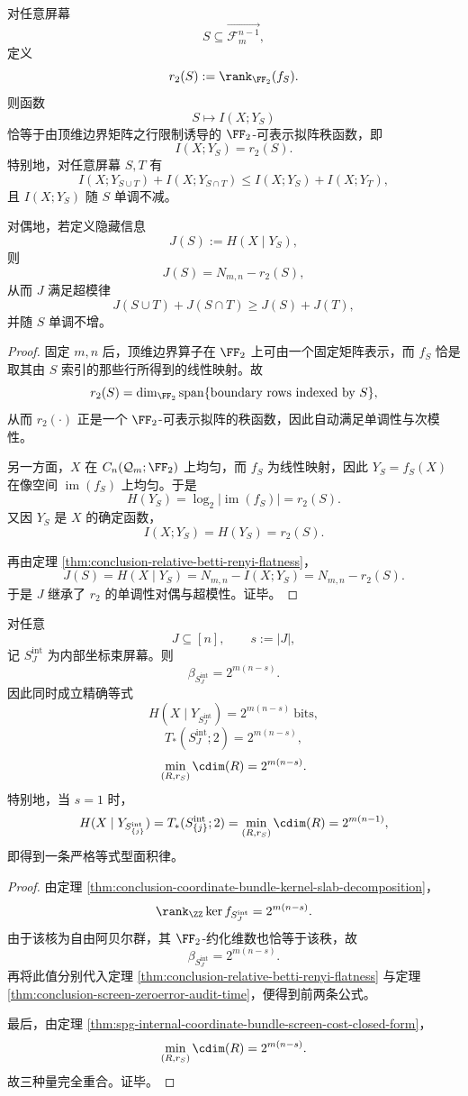 \begin{theorem}[屏幕信息的拟阵秩结构与隐藏信息的超模律]\label{thm:conclusion-screen-information-matroid-supermodularity}
对任意屏幕
\[
S\subseteq \overrightarrow{\mathcal F_m^{n-1}},
\]
定义
\[
r_2(S):=\rank_{\FF_2}(f_S).
\]
则函数
\[
S\longmapsto I(X;Y_S)
\]
恰等于由顶维边界矩阵之行限制诱导的 \(\FF_2\)-可表示拟阵秩函数，即
\[
I(X;Y_S)=r_2(S).
\]
特别地，对任意屏幕 \(S,T\) 有
\[
I(X;Y_{S\cup T})+I(X;Y_{S\cap T})
\le
I(X;Y_S)+I(X;Y_T),
\]
且 \(I(X;Y_S)\) 随 \(S\) 单调不减。

对偶地，若定义隐藏信息
\[
J(S):=H(X\mid Y_S),
\]
则
\[
J(S)=N_{m,n}-r_2(S),
\]
从而 \(J\) 满足超模律
\[
J(S\cup T)+J(S\cap T)\ge J(S)+J(T),
\]
并随 \(S\) 单调不增。
\end{theorem}

\begin{proof}
固定 \(m,n\) 后，顶维边界算子在 \(\FF_2\) 上可由一个固定矩阵表示，而 \(f_S\) 恰是取其由 \(S\) 索引的那些行所得到的线性映射。故
\[
r_2(S)
=
\dim_{\FF_2}\operatorname{span}\{\text{boundary rows indexed by }S\},
\]
从而 \(r_2(\cdot)\) 正是一个 \(\FF_2\)-可表示拟阵的秩函数，因此自动满足单调性与次模性。

另一方面，\(X\) 在 \(C_n(\mathcal Q_m;\FF_2)\) 上均匀，而 \(f_S\) 为线性映射，因此 \(Y_S=f_S(X)\) 在像空间 \(\operatorname{im}(f_S)\) 上均匀。于是
\[
H(Y_S)=\log_2 |\operatorname{im}(f_S)|=r_2(S).
\]
又因 \(Y_S\) 是 \(X\) 的确定函数，
\[
I(X;Y_S)=H(Y_S)=r_2(S).
\]

再由定理 \ref{thm:conclusion-relative-betti-renyi-flatness}，
\[
J(S)=H(X\mid Y_S)=N_{m,n}-I(X;Y_S)=N_{m,n}-r_2(S).
\]
于是 \(J\) 继承了 \(r_2\) 的单调性对偶与超模性。证毕。
\end{proof}

\begin{corollary}[内部坐标束屏幕上的精确面积律]\label{cor:conclusion-coordinate-bundle-exact-area-law}
对任意
\[
J\subseteq [n],
\qquad
s:=|J|,
\]
记 \(S_J^{\mathrm{int}}\) 为内部坐标束屏幕。则
\[
\beta_{S_J^{\mathrm{int}}}=2^{m(n-s)}.
\]
因此同时成立精确等式
\[
H(X\mid Y_{S_J^{\mathrm{int}}})=2^{m(n-s)}\ \text{bits},
\]
\[
T_\ast(S_J^{\mathrm{int}};2)=2^{m(n-s)},
\]
\[
\min_{(R,r_S)}\cdim(R)=2^{m(n-s)}.
\]
特别地，当 \(s=1\) 时，
\[
H(X\mid Y_{S_{\{j\}}^{\mathrm{int}}})
=
T_\ast(S_{\{j\}}^{\mathrm{int}};2)
=
\min_{(R,r_S)}\cdim(R)
=
2^{m(n-1)},
\]
即得到一条严格等式型面积律。
\end{corollary}

\begin{proof}
由定理 \ref{thm:conclusion-coordinate-bundle-kernel-slab-decomposition}，
\[
\rank_{\ZZ}\ker f_{S_J^{\mathrm{int}}}=2^{m(n-s)}.
\]
由于该核为自由阿贝尔群，其 \(\FF_2\)-约化维数也恰等于该秩，故
\[
\beta_{S_J^{\mathrm{int}}}=2^{m(n-s)}.
\]
再将此值分别代入定理 \ref{thm:conclusion-relative-betti-renyi-flatness} 与定理 \ref{thm:conclusion-screen-zeroerror-audit-time}，便得到前两条公式。

最后，由定理 \ref{thm:spg-internal-coordinate-bundle-screen-cost-closed-form}，
\[
\min_{(R,r_S)}\cdim(R)=2^{m(n-s)}.
\]
故三种量完全重合。证毕。
\end{proof}


